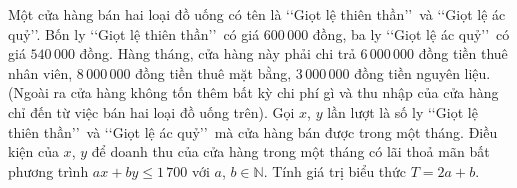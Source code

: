 \begin{bt}%
	Một cửa hàng bán hai loại đồ uống có tên là \lq\lq Giọt lệ thiên thần\rq\rq \ và \lq\lq Giọt lệ ác quỷ\rq\rq. Bốn ly \lq\lq Giọt lệ thiên thần\rq\rq \ có giá $600\,000$ đồng, ba ly \lq\lq Giọt lệ ác quỷ\rq\rq \ có giá $540\,000$ đồng. Hàng tháng, cửa hàng này phải chi trả $6\,000\,000$ đồng tiền thuê nhân viên, $8\,000\,000$ đồng tiền thuê mặt bằng, $3\,000\,000$ đồng tiền nguyên liệu. (Ngoài ra cửa hàng không tốn thêm bất kỳ chi phí gì và thu nhập của cửa hàng chỉ đến từ việc bán hai loại đồ uống trên). Gọi $x$, $y$ lần lượt là số ly \lq\lq Giọt lệ thiên thần\rq\rq \ và \lq\lq Giọt lệ ác quỷ\rq\rq \  mà cửa hàng bán được trong một tháng. Điều kiện của $x$, $y$ để doanh thu của cửa hàng trong một tháng có lãi thoả mãn bất phương trình $ax + by \leq 1\,700$ với $a$, $b \in \mathbb{N}$. Tính giá trị biểu thức $T = 2a + b$.
\end{bt}

